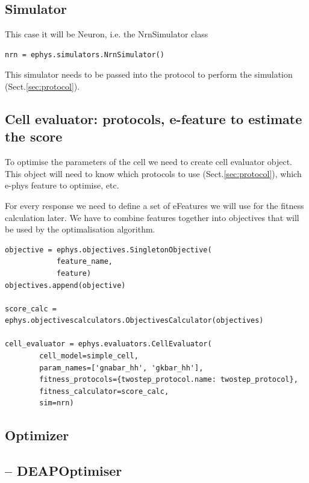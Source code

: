 \subsection{Simulator}
\label{sec:cell-simulator}

This case it will be Neuron, i.e. the NrnSimulator class
\begin{lstlisting}
nrn = ephys.simulators.NrnSimulator()
\end{lstlisting}

This simulator needs to be passed into the protocol to perform the simulation
(Sect.\ref{sec:protocol}).


\subsection{Cell evaluator: protocols, e-feature to estimate the score}
\label{sec:cell-evaluator}


To optimise the parameters of the cell we need to create cell evaluator object.
This object will need to know which protocols to use (Sect.\ref{sec:protocol}),
which e-phys feature to optimise, etc.

For every response we need to define a set of eFeatures we will use for the
fitness calculation later. We have to combine features together into objectives
that will be used by the optimalisation algorithm.

\begin{lstlisting}
objective = ephys.objectives.SingletonObjective(
            feature_name,
            feature)
objectives.append(objective)

score_calc = ephys.objectivescalculators.ObjectivesCalculator(objectives)

cell_evaluator = ephys.evaluators.CellEvaluator(
        cell_model=simple_cell,
        param_names=['gnabar_hh', 'gkbar_hh'],
        fitness_protocols={twostep_protocol.name: twostep_protocol},
        fitness_calculator=score_calc,
        sim=nrn)
\end{lstlisting}


\subsection{Optimizer}

\subsection{-- DEAPOptimiser}
\label{sec:DEAPOptimiser}


